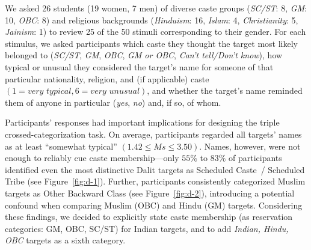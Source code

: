 \documentclass[12pt, a4paper]{article}
\begin{document}
We asked 26 students (19 women, 7 men) of diverse caste groups (\emph{SC/ST}: 8, \emph{GM}: 10, \emph{OBC}: 8) and religious backgrounds (\emph{Hinduism}: 16, \emph{Islam}: 4, \emph{Christianity}: 5, \emph{Jainism}: 1) to review 25 of the 50 stimuli corresponding to their gender. For each stimulus, we asked participants which caste they thought the target most likely belonged to (\emph{SC/ST}, \emph{GM}, \emph{OBC}, \emph{GM or OBC}, \emph{Can't tell/Don't know}), how typical or unusual they considered the target's name for someone of that particular nationality, religion, and (if applicable) caste $(1 = \textit{very typical}, 6 = \textit{very unusual})$, and whether the target's name reminded them of anyone in particular (\emph{yes}, \emph{no}) and, if so, of whom. 

Participants' responses had important implications for designing the triple crossed-categorization task. On average, participants regarded all targets' names as at least ``somewhat typical'' $(1.42 \le \textit{Ms} \le 3.50)$. Names, however, were not enough to reliably cue caste membership---only $55\%$ to $83\%$ of participants identified even the most distinctive Dalit targets as Scheduled Caste~/ Scheduled Tribe (see Figure~\ref{fig:d-1}). Further, participants consistently categorized Muslim targets as Other Backward Class (see Figure~\ref{fig:d-2}), introducing a potential confound when comparing Muslim (OBC) and Hindu (GM) targets. Considering these findings, we decided to explicitly state caste membership (as reservation categories: GM, OBC, SC/ST) for Indian targets, and to add \emph{Indian, Hindu, OBC} targets as a sixth category.
\end{document}
